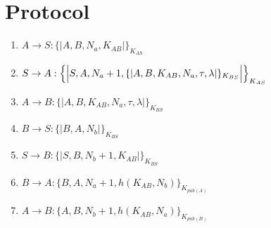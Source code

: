 \section{Protocol}

\begin{enumerate}
    \item $ A \rightarrow S : \{|A, B, N_a, K_{AB}|\}_{K_{AS}}$
    \item $ S \rightarrow A : \Bigl\{\Bigl|S,A, N_a + 1, \{|A,B,K_{AB},N_a, \tau, \lambda |\}_{K_{BS}}\Bigr|\Bigr\}_{K_{AS}}$
    \item $ A \rightarrow B : \{|A,B,K_{AB},N_a, \tau, \lambda |\}_{K_{BS}}$
    \item $ B \rightarrow S : \{|B, A, N_b|\}_{K_{BS}}$
    \item $ S \rightarrow B : \{|S, B, N_b + 1, K_{AB}|\}_{K_{BS}}$
    \item $ B \rightarrow A : \{B, A, N_a+1, h(K_{AB}, N_b)\}_{K_{pub(A)}}$
    \item $ A \rightarrow B : \{A, B, N_b+1, h(K_{AB}, N_a)\}_{K_{pub(B)}}$

\end{enumerate}